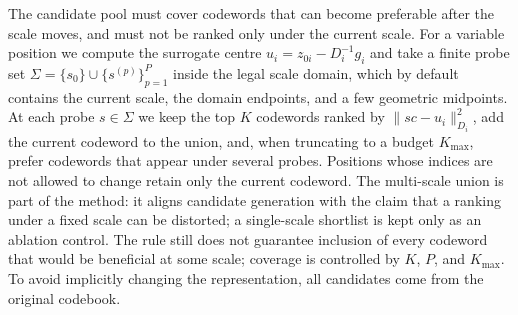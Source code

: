 The candidate pool must cover codewords that can become preferable after the scale moves, and must not be ranked only under the current scale.
For a variable position we compute the surrogate centre $u_i=z_{0i}-D_i^{-1}g_i$ and take a finite probe set $\Sigma=\{s_0\}\cup\{s^{(p)}\}_{p=1}^{P}$ inside the legal scale domain, which by default contains the current scale, the domain endpoints, and a few geometric midpoints.
At each probe $s\in\Sigma$ we keep the top $K$ codewords ranked by $\|sc-u_i\|_{D_i}^2$, add the current codeword to the union, and, when truncating to a budget $K_{\max}$, prefer codewords that appear under several probes.
Positions whose indices are not allowed to change retain only the current codeword.
The multi-scale union is part of the method: it aligns candidate generation with the claim that a ranking under a fixed scale can be distorted; a single-scale shortlist is kept only as an ablation control.
The rule still does not guarantee inclusion of every codeword that would be beneficial at some scale; coverage is controlled by $K$, $P$, and $K_{\max}$.
To avoid implicitly changing the representation, all candidates come from the original codebook.

